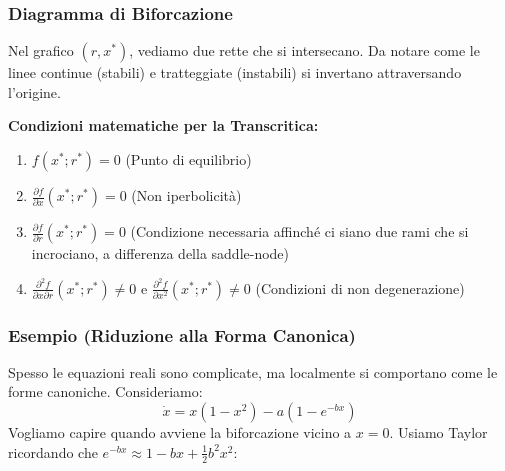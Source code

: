 \documentclass[openany]{book}
\theoremstyle{definition}
\theoremstyle{remark}
\begin{document}
\subsubsection*{Diagramma di Biforcazione}
Nel grafico $(r, x^*)$, vediamo due rette che si intersecano. Da notare come le linee continue (stabili) e tratteggiate (instabili) si invertano attraversando l'origine.

\begin{center}
\end{center}

\textbf{Condizioni matematiche per la Transcritica:}
\begin{enumerate}
    \item $f(x^*; r^*) = 0$ (Punto di equilibrio)
    \item $\frac{\partial f}{\partial x}(x^*; r^*) = 0$ (Non iperbolicità)
    \item $\frac{\partial f}{\partial r}(x^*; r^*) = 0$ (Condizione necessaria affinché ci siano due rami che si incrociano, a differenza della saddle-node)
    \item $\frac{\partial^2 f}{\partial x \partial r}(x^*; r^*) \neq 0$ e $\frac{\partial^2 f}{\partial x^2}(x^*; r^*) \neq 0$ (Condizioni di non degenerazione)
\end{enumerate}

\subsubsection*{Esempio (Riduzione alla Forma Canonica)}
Spesso le equazioni reali sono complicate, ma localmente si comportano come le forme canoniche.
Consideriamo:
\[ \dot{x} = x(1-x^2) - a(1-e^{-bx}) \]
Vogliamo capire quando avviene la biforcazione vicino a $x=0$.
Usiamo Taylor ricordando che $e^{-bx} \approx 1 - bx + \frac{1}{2}b^2x^2$:
\end{document}
